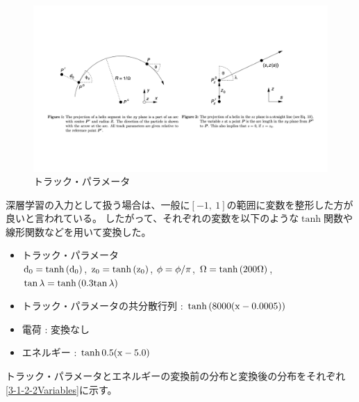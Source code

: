 \begin{figure}[htbp]
 \centering
 \includegraphics[trim = 0 150 0 150, width=1.0\textwidth]{Figure/3Networks/3-1-2-1TrackParameters.png}
 \caption{トラック・パラメータ\cite{TrackParametersLCIO}}
 \label{3-1-2-1TrackParameters}
\end{figure}

深層学習の入力として扱う場合は、一般に$[-1,\ 1]$の範囲に変数を整形した方が良いと言われている。
したがって、それぞれの変数を以下のような$\tanh$関数や線形関数などを用いて変換した。

\begin{itemize}
 \item トラック・パラメータ\\
 ${\rm d_0} = \tanh{({\rm d_0})}$,
 ${\rm z_0} = \tanh{({\rm z_0})}$,
 ${\rm \phi} = {\rm \phi}/\pi$,
 ${\rm \Omega} = \tanh{(200{\rm \Omega})}$,
 ${\rm \tan{\lambda}} = \tanh{(0.3{\rm \tan{\lambda}})}$
 \item トラック・パラメータの共分散行列 : $\tanh{(8000({\rm x}-0.0005))}$
 \item 電荷 : 変換なし
 \item エネルギー : $\tanh{0.5({\rm x}-5.0)}$
\end{itemize}

トラック・パラメータとエネルギーの変換前の分布と変換後の分布をそれぞれ\ref{3-1-2-2Variables}に示す。


